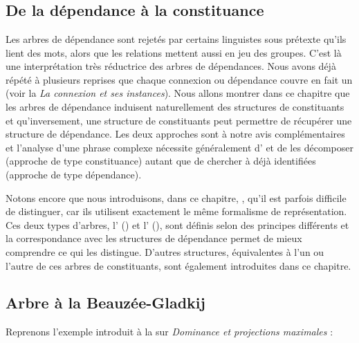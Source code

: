 \chapter{}\label{sec:3.4}

\section{De la dépendance à la constituance}\label{sec:3.4.0}

Les arbres de dépendance sont rejetés par certains linguistes sous prétexte qu’ils lient des mots, alors que les relations mettent aussi en jeu des groupes. C’est là une interprétation très réductrice des arbres de dépendances. Nous avons déjà répété à plusieurs reprises que chaque connexion ou dépendance couvre en fait un  (voir la  \textit{La connexion et ses instances}). Nous allons montrer dans ce chapitre que les arbres de dépendance induisent naturellement des structures de constituants et qu’inversement, une structure de constituants peut permettre de récupérer une structure de dépendance. Les deux approches sont à notre avis complémentaires et l’analyse d’une phrase complexe nécessite généralement d’ et de les décomposer (approche de type constituance) autant que de chercher à  déjà identifiées (approche de type dépendance).

Notons encore que nous introduisons, dans ce chapitre,  , qu’il est parfois difficile de distinguer, car ils utilisent exactement le même formalisme de représentation. Ces deux types d'arbres, l’ () et l’ (), sont définis selon des principes différents et la correspondance avec les structures de dépendance permet de mieux comprendre ce qui les distingue. D’autres structures, équivalentes à l’un ou l’autre de ces arbres de constituants, sont également introduites dans ce chapitre.

\section{ Arbre à la Beauzée-Gladkij}\label{sec:3.4.1}

Reprenons l’exemple introduit à la  sur \textit{Dominance et projections maximales} :


